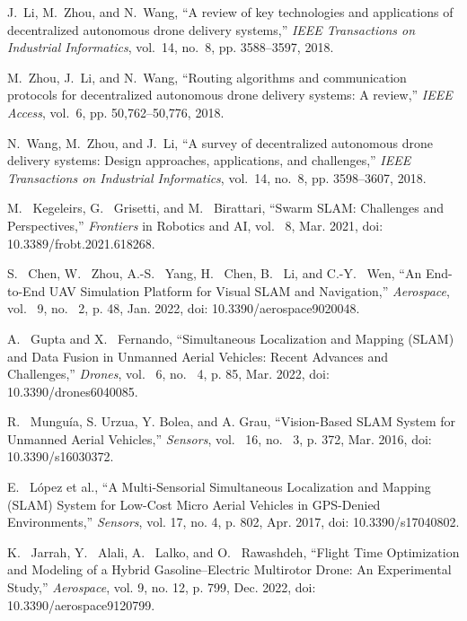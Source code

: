 \documentclass[preprint,12pt]{elsarticle}
\begin{document}
\begin{thebibliography}{1}

J.~Li, M.~Zhou, and N.~Wang, ``A review of key technologies and applications of decentralized autonomous drone delivery systems,'' \emph{IEEE Transactions on Industrial Informatics}, vol.~14, no.~8, pp. 3588--3597, 2018.

M.~Zhou, J.~Li, and N.~Wang, ``Routing algorithms and communication protocols for decentralized autonomous drone delivery systems: A review,'' \emph{IEEE Access}, vol.~6, pp. 50,762--50,776, 2018.

N.~Wang, M.~Zhou, and J.~Li, ``A survey of decentralized autonomous drone delivery systems: Design approaches, applications, and challenges,'' \emph{IEEE Transactions on Industrial Informatics}, vol.~14, no.~8, pp. 3598--3607, 2018.

M. ~Kegeleirs, G. ~Grisetti, and M. ~Birattari, “Swarm SLAM: Challenges and Perspectives,” \emph{Frontiers} in Robotics and AI, vol. ~8, Mar. 2021, doi: 10.3389/frobt.2021.618268.

S. ~Chen, W. ~Zhou, A.-S. ~Yang, H. ~Chen, B. ~Li, and C.-Y. ~Wen, “An End-to-End UAV Simulation Platform for Visual SLAM and Navigation,” \emph{Aerospace}, vol. ~9, no. ~2, p. 48, Jan. 2022, doi: 10.3390/aerospace9020048.

A. ~Gupta and X. ~Fernando, “Simultaneous Localization and Mapping (SLAM) and Data Fusion in Unmanned Aerial Vehicles: Recent Advances and Challenges,” \emph{Drones}, vol. ~6, no. ~4, p. 85, Mar. 2022, doi: 10.3390/drones6040085.

R. ~Munguía, S. Urzua, Y. Bolea, and A. Grau, “Vision-Based SLAM System for Unmanned Aerial Vehicles,” \emph{Sensors}, vol. ~16, no. ~3, p. 372, Mar. 2016, doi: 10.3390/s16030372.

E. ~López et al., “A Multi-Sensorial Simultaneous Localization and Mapping (SLAM) System for Low-Cost Micro Aerial Vehicles in GPS-Denied Environments,” \emph{Sensors}, vol. 17, no. 4, p. 802, Apr. 2017, doi: 10.3390/s17040802.

K. ~Jarrah, Y. ~Alali, A. ~Lalko, and O. ~Rawashdeh, “Flight Time Optimization and Modeling of a Hybrid Gasoline–Electric Multirotor Drone: An Experimental Study,” \emph{Aerospace}, vol. 9, no. 12, p. 799, Dec. 2022, doi: 10.3390/aerospace9120799.


\end{thebibliography}
\end{document}
